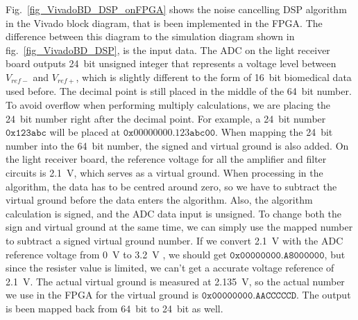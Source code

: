 Fig.~\ref{fig_VivadoBD_DSP_onFPGA} shows the noise cancelling DSP algorithm in the Vivado block diagram, that is been implemented in the FPGA.  The difference between this diagram to the simulation diagram shown in fig.~\ref{fig_VivadoBD_DSP}, is the input data.  The ADC on the light receiver board outputs \qty{24}{bit} unsigned integer that represents a voltage level between $V_{ref-}$ and $V_{ref+}$, which is slightly different to the form of \qty{16}{bit} biomedical data used before.  The decimal point is still placed in the middle of the \qty{64}{bit} number.  To avoid overflow when performing multiply calculations, we are placing the \qty{24}{bit} number right after the decimal point.  For example, a \qty{24}{bit} number $\mathtt{0x123abc}$ will be placed at $\mathtt{0x00000000.123abc00}$.  When mapping the \qty{24}{bit} number into the \qty{64}{bit} number, the signed and virtual ground is also added.  On the light receiver board, the reference voltage for all the amplifier and filter circuits is \qty{2.1}{V}, which serves as a virtual ground.  When processing in the algorithm, the data has to be centred around zero, so we have to subtract the virtual ground before the data enters the algorithm.  Also, the algorithm calculation is signed, and the ADC data input is unsigned.  To change both the sign and virtual ground at the same time, we can simply use the mapped number to subtract a signed virtual ground number. 
 If we convert \qty{2.1}{V} with the ADC reference voltage from \qty{0}{V} to \qty{3.2}{V} , we should get $\mathtt{0x00000000.A8000000}$, but since the resister value is limited, we can't get a accurate voltage reference of \qty{2.1}{V}.  The actual virtual ground is measured at \qty{2.135}{V}, so the actual number we use in the FPGA for the virtual ground is $\mathtt{0x00000000.AACCCCCD}$.  The output is been mapped back from \qty{64}{bit} to \qty{24}{bit} as well.


